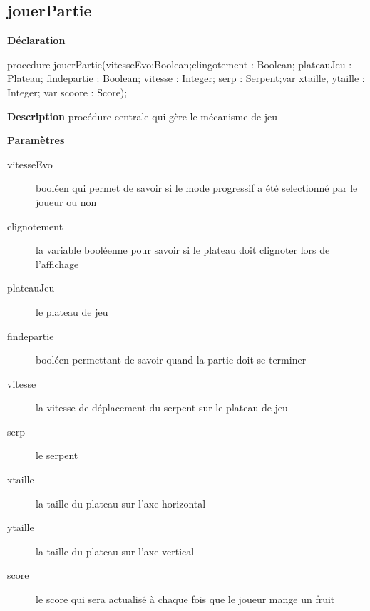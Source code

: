 \documentclass{report}
\newif\ifpdf
\begin{document}
\subsection*{jouerPartie}
\fi
\label{Jouer-jouerPartie}
\begin{list}{}{
\setlength{\itemindent}{0cm}
\setlength{\listparindent}{0cm}
\setlength{\leftmargin}{\evensidemargin}
\addtolength{\leftmargin}{\tmplength}
\settowidth{\labelsep}{X}
\addtolength{\leftmargin}{\labelsep}
\setlength{\labelwidth}{\tmplength}
}
\item[\textbf{Déclaration}\hfill]
\ifpdf
\begin{flushleft}
\fi
\begin{ttfamily}
procedure jouerPartie(vitesseEvo:Boolean;clingotement : Boolean; plateauJeu : Plateau; findepartie : Boolean; vitesse : Integer; serp : Serpent;var xtaille, ytaille : Integer; var scoore : Score);\end{ttfamily}

\ifpdf
\end{flushleft}
\fi

\par
\item[\textbf{Description}]
procédure centrale qui gère le mécanisme de jeu         \par
\item[\textbf{Paramètres}]
\begin{description}
\item[vitesseEvo] booléen qui permet de savoir si le mode progressif a été selectionné par le joueur ou non
\item[clignotement] la variable booléenne pour savoir si le plateau doit clignoter lors de l'affichage
\item[plateauJeu] le plateau de jeu
\item[findepartie] booléen permettant de savoir quand la partie doit se terminer
\item[vitesse] la vitesse de déplacement du serpent sur le plateau de jeu
\item[serp] le serpent
\item[xtaille] la taille du plateau sur l'axe horizontal
\item[ytaille] la taille du plateau sur l'axe vertical
\item[score] le score qui sera actualisé à chaque fois que le joueur mange un fruit
\end{description}


\end{list}
\ifpdf
\end{document}
